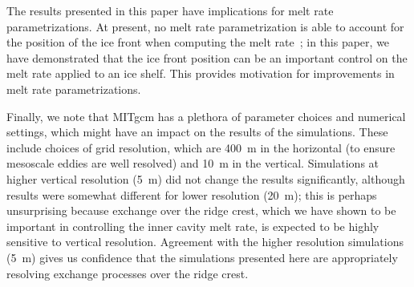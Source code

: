 \documentclass[draft]{agujournal2019}
\begin{document}
The results presented in this paper have implications for melt rate parametrizations. At present, no melt rate parametrization is able to account for the position of the ice front when computing the melt rate~\cite{AsayDavis2017CurrClimChRep}; in this paper, we have demonstrated that the ice front position can be an important control on the melt rate applied to an ice shelf. This provides motivation for improvements in melt rate parametrizations. %

Finally, we note that MITgcm has a plethora of parameter choices and numerical settings, which might have an impact on the results of the simulations. These include choices of grid resolution, which are 400~m in the horizontal (to ensure mesoscale eddies are well resolved) and 10~m in the vertical. Simulations at higher vertical resolution (5~m) did not change the results significantly, although results were somewhat different for lower resolution (20~m); this is perhaps unsurprising because exchange over the ridge crest, which we have shown to be important in controlling the inner cavity melt rate, is expected to be highly sensitive to vertical resolution. Agreement with the higher resolution simulations (5~m) gives us confidence that the simulations presented here are appropriately resolving exchange processes over the ridge crest. 
\end{document}
